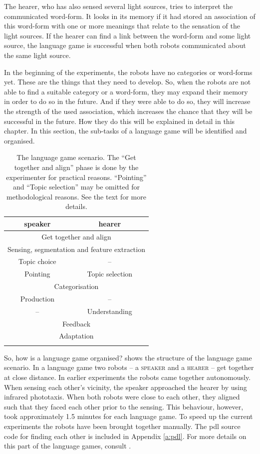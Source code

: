 The hearer, who has also sensed several light sources, tries to interpret the communicated word-form. It looks in its memory if it had stored an association of this word-form with one or more meanings that relate to the sensation of the light sources. If the hearer can find a link between the word-form and some light source, the language game is successful when both robots communicated about the same light source.

In the beginning of the experiments, the robots have no categories or word-forms yet. These are the things that they need to develop. So, when the robots are not able to find a suitable category or a word-form, they may expand their memory in order to do so in the future. And if they were able to do so, they will increase the strength of the used association, which increases the chance that they will be successful in the future. How they do this will be explained in detail in this chapter. In this section, the sub-tasks of a language game will be identified and organised.

\begin{table}
\centering
\begin{tabular}{cc}
\lsptoprule
{\sc speaker} & {\sc hearer}\\
\midrule
\multicolumn{2}{c}{{Get together and align}}\\\hline
\multicolumn{2}{c}{Sensing, segmentation and feature extraction}\\\hline
Topic choice & --\\\hline
{Pointing} & {Topic selection}\\\hline
\multicolumn{2}{c}{Categorisation}\\\hline
Production & --\\\hline
-- & Understanding\\\hline
\multicolumn{2}{c}{Feedback}\\\hline
\multicolumn{2}{c}{Adaptation}\\\lspbottomrule
\end{tabular}
\caption{The language game scenario. The ``Get together and align'' phase is done by the experimenter for practical reasons. ``Pointing'' and ``Topic selection'' may be omitted for methodological reasons. See the text for more details.}
\label{t:scenario1}
\end{table}


So, how is a language game organised?  shows the structure of the language game scenario. In a language game two robots -- a {\scshape speaker} and a {\scshape hearer} -- get together at close distance. In earlier experiments \citep{steelsvogt:1997} the robots came together autonomously. When sensing each other's vicinity, the speaker approached the hearer by using infrared phototaxis. When both robots were close to each other, they aligned such that they faced each other prior to the sensing. This behaviour, however, took approximately 1.5 minutes for each language game. To speed up the current experiments the robots have been brought together manually. The {\sc pdl} source code for finding each other is included in Appendix \ref{a:pdl}. For more details on this part of the language games, consult \citealt{vogt:1997}.  

